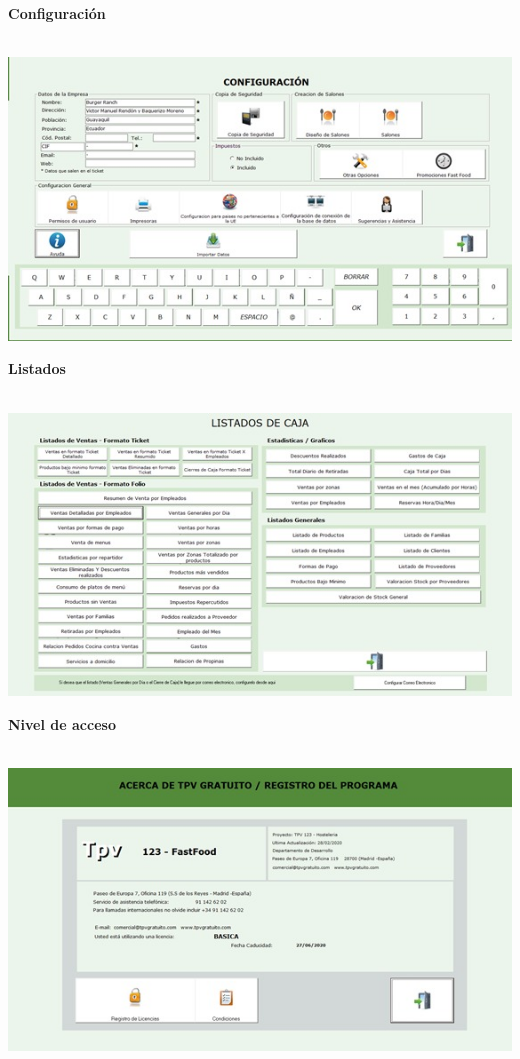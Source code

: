 \documentclass[12pt,a4paper]{article}
\begin{document}
 \par\vspace{0.5cm}
\textbf {Configuración}\\\\
\begin{center}
 \includegraphics[scale=0.7]{9.jpg} 
 \end{center}
 \par\vspace{6cm}
\textbf {Listados}\\\\
\begin{center}
 \includegraphics[scale=0.7]{10.jpg} 
 \end{center}
 \par\vspace{0.5cm}
 \textbf {Nivel de acceso}\\\\
\begin{center}
 \includegraphics[scale=0.7]{11.jpg} 
 \end{center}
\end{document}
